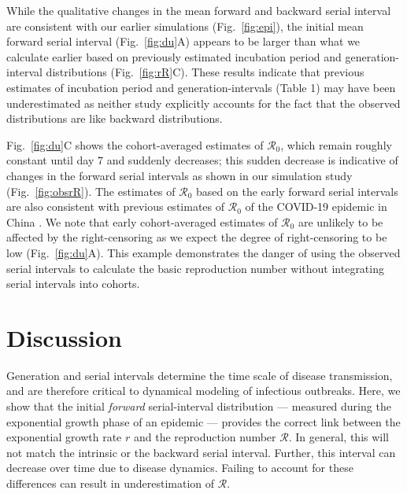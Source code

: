 \documentclass[12pt]{article}
\newcommand{\fref}[1]{Fig.~\ref{fig:#1}}
\newcommand{\Rx}[1]{\ensuremath{{\mathcal R}_{#1}}\xspace}
\newcommand{\Ro}{\Rx{0}}
\newcommand{\RR}{\ensuremath{{\mathcal R}}\xspace}
\begin{document}
While the qualitative changes in the mean forward and backward serial interval are consistent with our earlier simulations (\fref{epi}), the initial mean forward serial interval (\fref{du}A) appears to be larger than what we calculate earlier based on previously estimated incubation period and generation-interval distributions (\fref{rR}C).
These results indicate that previous estimates of incubation period and generation-intervals (Table 1) may have been underestimated as neither study explicitly accounts for the fact that the observed distributions are like backward distributions.

\fref{du}C shows the cohort-averaged estimates of \Ro, which remain roughly constant until day 7 and suddenly decreases;
this sudden decrease is indicative of changes in the forward serial intervals as shown in our simulation study (\fref{obsrR}).
The estimates of \Ro based on the early forward serial intervals are also consistent with previous estimates of \Ro of the COVID-19 epidemic in China \citep{majumder2020early, park2020reconciling}.
We note that early cohort-averaged estimates of \Ro are unlikely to be affected by the right-censoring as we expect the degree of right-censoring to be low (\fref{du}A).
This example demonstrates the danger of using the observed serial intervals to calculate the basic reproduction number without integrating serial intervals into cohorts.

\section{Discussion}

Generation and serial intervals determine the time scale of disease transmission, and are therefore critical to dynamical modeling of infectious outbreaks.
Here, we show that the initial \emph{forward} serial-interval distribution --- measured during the exponential growth phase of an epidemic --- provides the correct link between the exponential growth rate $r$ and the reproduction number \RR.
In general, this will not match the intrinsic or the backward serial interval.
Further, this interval can decrease over time due to disease dynamics. 
Failing to account for these differences can result in underestimation of \RR.
\end{document}
